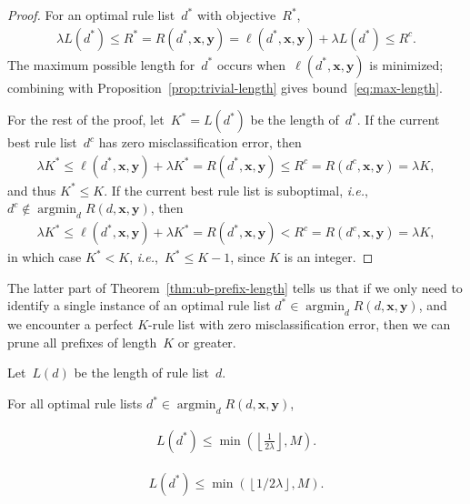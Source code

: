 \documentclass[twoside,11pt]{article}
\def\ie{{\it i.e.},~}
\newcommand{\x}{\mathbf{x}}
\newcommand{\y}{\mathbf{y}}
\def\RL{{d}}
\def\Obj{R}
\def\Loss{\ell}
\def\Reg{{\lambda}}
\def\CurrentObj{{R^c}}
\def\CurrentRL{d^c}
\def\OptimalObj{R^*}
\def\OptimalRL{d^*}
\DeclareMathOperator*{\argmin}{argmin}
\newcommand{\nn}{\nonumber}
\begin{document}
\begin{arxiv}
\begin{proof}
For an optimal rule list~$\OptimalRL$ with objective~$\OptimalObj$,
\begin{align}
\Reg L(\OptimalRL) \le \OptimalObj = \Obj(\OptimalRL, \x, \y)
= \Loss(\OptimalRL, \x, \y) + \Reg L(\OptimalRL)
\le \CurrentObj. \nn
\end{align}
The maximum possible length for~$\OptimalRL$ occurs
when~$\Loss(\OptimalRL, \x, \y)$ is minimized;
combining with Proposition~\ref{prop:trivial-length}
gives bound~\eqref{eq:max-length}.

For the rest of the proof,
let~${K^* = L(\OptimalRL)}$ be the length of~$\OptimalRL$.
%
If the current best rule list~$\CurrentRL$ has zero
misclassification error, then
\begin{align}
\Reg K^* \leq \Loss(\OptimalRL, \x, \y) + \Reg K^* = \Obj(\OptimalRL, \x, \y)
\le \CurrentObj = \Obj(\CurrentRL, \x, \y) = \Reg K, \nn
\end{align}
and thus ${K^* \leq K}$.
%
If the current best rule list is suboptimal,
\ie ${\CurrentRL \notin \argmin_\RL \Obj(\RL, \x, \y)}$, then
%
\begin{align}
\Reg K^* \leq \Loss(\OptimalRL, \x, \y) + \Reg K^* = \Obj(\OptimalRL, \x, \y)
< \CurrentObj = \Obj(\CurrentRL, \x, \y) = \Reg K, \nn
\end{align}
in which case ${K^* < K}$, \ie ${K^* \leq K-1}$, since $K$ is an integer.
\end{proof}

The latter part of Theorem~\ref{thm:ub-prefix-length} tells us that
if we only need to identify a single instance of an optimal rule list
${\OptimalRL \in \argmin_\RL \Obj(\RL, \x, \y)}$, and we encounter a perfect
$K$-rule list with zero misclassification error, then we can prune all
prefixes of length~$K$ or greater.

\end{arxiv}

\begin{corollary}
\label{cor:ub-prefix-length}
\begin{arxiv}
Let~$L(\RL)$ be the length of rule list~$\RL$.
\end{arxiv}
%
For all optimal rule lists ${\OptimalRL \in \argmin_\RL \Obj(\RL, \x, \y)}$,
\begin{arxiv}
\begin{align}
L(\OptimalRL) \le \min \left( \left\lfloor \frac{1}{2\Reg} \right\rfloor, M \right).
\label{eq:max-length-trivial}
\end{align}
\end{arxiv}
\begin{kdd}
\begin{align}
L(\OptimalRL) \le \min \left( \left\lfloor 1 / 2\Reg \right\rfloor, M \right).
\label{eq:max-length-trivial}
\end{align}
\end{kdd}
\end{corollary}
\end{document}
